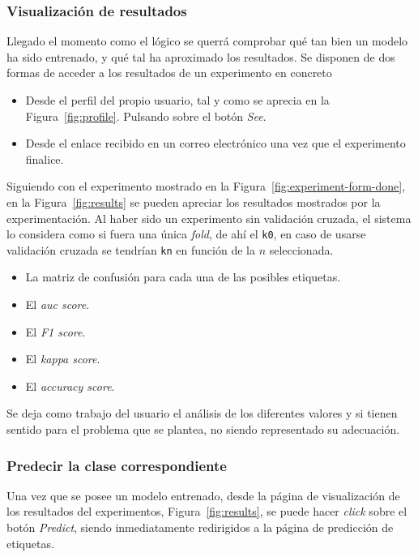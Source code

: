 
\subsubsection{Visualización de resultados}
Llegado el momento como el lógico se querrá comprobar qué tan bien un modelo ha sido entrenado, y qué tal ha aproximado los resultados. Se disponen de dos formas de acceder a los resultados de un experimento en concreto

\begin{itemize}
\item Desde el perfil del propio usuario, tal y como se aprecia en la Figura~\ref{fig:profile}. Pulsando sobre el botón \textit{See}.
\item Desde el enlace recibido en un correo electrónico una vez que el experimento finalice.
\end{itemize}


Siguiendo con el experimento mostrado en la Figura~\ref{fig:experiment-form-done}, en la Figura~\ref{fig:results} se pueden apreciar los resultados mostrados por la experimentación. Al haber sido un experimento sin validación cruzada, el sistema lo considera como si fuera una única \textit{fold}, de ahí el \texttt{k0}, en caso de usarse validación cruzada se tendrían \texttt{kn} en función de la $n$ seleccionada.

\begin{itemize}
\item La matriz de confusión para cada una de las posibles etiquetas.
\item El \textit{auc score}.
\item El \textit{F1 score}.
\item El \textit{kappa score}.
\item El \textit{accuracy score}.
\end{itemize}

Se deja como trabajo del usuario el análisis de los diferentes valores y si tienen sentido para el problema que se plantea, no siendo representado su adecuación.


\subsubsection{Predecir la clase correspondiente}
Una vez que se posee un modelo entrenado, desde la página de visualización de los resultados del experimentos, Figura~\ref{fig:results}, se puede hacer \textit{click} sobre el botón \textit{Predict}, siendo inmediatamente redirigidos a la página de predicción de etiquetas.

